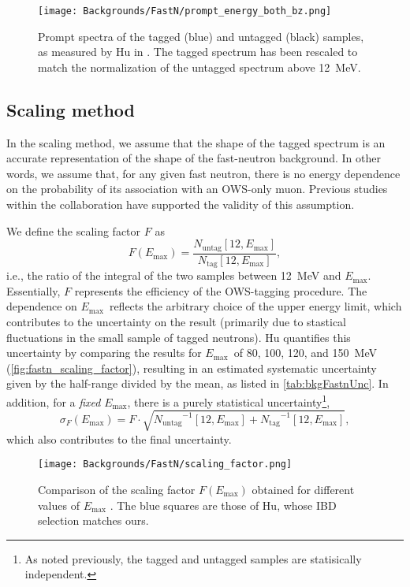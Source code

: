 \documentclass[../thesis.tex]{subfiles}
\begin{document}
\begin{figure}[h]
  \texttt{[image: Backgrounds/FastN/prompt\_energy\_both\_bz.png]}
  \caption{Prompt spectra of the tagged (blue) and untagged (black) samples, as measured by Hu in \cite{fastn}. The tagged spectrum has been rescaled to match the normalization of the untagged spectrum above 12~MeV.}
  \label{fig:fastn_prompt_energy_both_bz}
\end{figure}

\subsection{Scaling method}
\label{sec:fastn_scaling}

In the scaling method, we assume that the shape of the tagged spectrum is an accurate representation of the shape of the fast-neutron background. In other words, we assume that, for any given fast neutron, there is no energy dependence on the probability of its association with an OWS-only muon. Previous studies within the collaboration have supported the validity of this assumption.

\def\emax{\ensuremath{E_\mathrm{max}}} \def\ntag{\ensuremath{N_\mathrm{tag}}}
\def\nuntag{\ensuremath{N_\mathrm{untag}}}

We define the scaling factor $F$ as \[ F(\emax) = \frac{\nuntag[12, \emax]}{\ntag[12, \emax]}, \] i.e., the ratio of the integral of the two samples between 12~MeV and \emax. Essentially, $F$ represents the efficiency of the OWS-tagging procedure. The dependence on \emax\ reflects the arbitrary choice of the upper energy limit, which contributes to the uncertainty on the result (primarily due to stastical fluctuations in the small sample of tagged neutrons). Hu quantifies this uncertainty by comparing the results for \emax\ of 80, 100, 120, and 150~MeV (\autoref{fig:fastn_scaling_factor}), resulting in an estimated systematic uncertainty given by the half-range divided by the mean, as listed in \autoref{tab:bkgFastnUnc}. In addition, for a \emph{fixed} \emax, there is a purely statistical uncertainty\footnote{As noted previously, the tagged and untagged samples are statisically independent.},
\[ \sigma_F(\emax) = F \cdot \sqrt{\nuntag^{-1}[12, \emax] + \ntag^{-1}[12,
    \emax]},
\]
which also contributes to the final uncertainty.

\begin{figure}[h]
  \texttt{[image: Backgrounds/FastN/scaling\_factor.png]}
  \caption{Comparison of the scaling factor $F(E_{\mathrm{max}})$ obtained for different values of $E_{\mathrm{max}}$ \cite{fastn}. The blue squares are those of Hu, whose IBD selection matches ours.}
  \label{fig:fastn_scaling_factor}
\end{figure}
\end{document}
